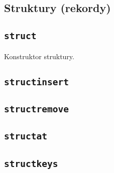 \subsection{Struktury (rekordy)}
\label{viua_vm_ops_struct}

\subsection{\texttt{struct}}

Konstruktor struktury.

\subsection{\texttt{structinsert}}
\subsection{\texttt{structremove}}
\subsection{\texttt{structat}}
\subsection{\texttt{structkeys}}
